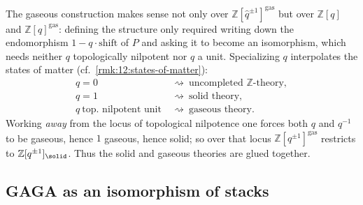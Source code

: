 \begin{remark}
\label{rmk:15:glue}
The gaseous construction makes sense not only over
$\mathbb{Z}[\widehat q^{\pm1}]^{\mathrm{gas}}$ but over
$\mathbb{Z}[q]$ and $\mathbb{Z}[q]^{\mathrm{gas}}$: defining the structure only required
writing down the endomorphism $1 - q\cdot\mathrm{shift}$ of $P$ and asking it to
become an isomorphism, which needs neither $q$ topologically nilpotent nor $q$ a unit.
Specializing $q$ interpolates the states of matter (cf.\ \cref{rmk:12:states-of-matter}):
\begin{equation*}
\begin{aligned}
q = 0&\ \rightsquigarrow\ \text{uncompleted } \mathbb{Z}\text{-theory},\\
q = 1&\ \rightsquigarrow\ \text{solid theory},\\
q\ \text{top.\ nilpotent unit}&\ \rightsquigarrow\ \text{gaseous theory}.
\end{aligned}
\end{equation*}
Working \emph{away} from the locus of topological nilpotence one forces both $q$ and
$q^{-1}$ to be gaseous, hence $1$ gaseous, hence solid; so over that locus
$\mathbb{Z}[q^{\pm1}]^{\mathrm{gas}}$ restricts to $\mathbb{Z}[q^{\pm1}]_{\solid}$.
Thus the solid and gaseous theories are glued together.
\end{remark}

\subsection{GAGA as an isomorphism of stacks}


